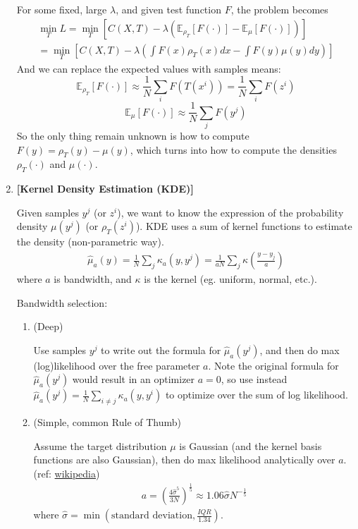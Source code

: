 \documentclass[11pt]{article}
\begin{document}
\begin{enumerate}
    For some fixed, large $\lambda$, and given test function $F$, the problem becomes
    \begin{align}
    \label{eq3}
        \min_T L 
        = \min_T \left[C(X,T) - \lambda (\mathbb{E}_{\rho_{T}} [F(\cdot)] - \mathbb{E}_{\mu} [F(\cdot)]) \right]\\
        = \min_T \left[C(X,T) - \lambda (\int F(x)\rho_T(x) dx - \int F(y)\mu(y) dy) \right]
    \end{align}
    And we can replace the expected values with samples means:
    $$
    \mathbb{E}_{\rho_{T}} [F(\cdot)] \approx \frac{1}{N} \sum_i F(T(x^i))
    = \frac{1}{N} \sum_i F(z^i)
    $$
    $$
    \mathbb{E}_{\mu} [F(\cdot)] \approx \frac{1}{N} \sum_j F(y^j)
    $$
    So the only thing remain unknown is how to compute $F(y) = \rho_T(y) - \mu(y)$, which turns into how to compute the densities $\rho_T(\cdot)$ and $\mu(\cdot)$.
    
    \item {\bf [Kernel Density Estimation (KDE)]}
    
    Given samples $y^j$ (or $z^i$), we want to know the expression of the probability density $\mu(y^j)$ (or $\rho_T(z^i)$). KDE uses a sum of kernel functions to estimate the density (non-parametric way).
    \begin{align*}
        \hat{\mu}_a(y) = \frac{1}{N} \sum_j \kappa_a(y,y^j)
        = \frac{1}{aN} \sum_j \kappa(\frac{y-y_j}{a})
    \end{align*}
    where $a$ is bandwidth, and $\kappa$ is the kernel (eg. uniform, normal, etc.).
    
    Bandwidth selection:
    \begin{enumerate}
        \item (Deep)
        
        Use samples $y^j$ to write out the formula for $\hat{\mu}_a(y^j)$, and then do max (log)likelihood over the free parameter $a$. Note the original formula for $\hat{\mu}_a(y^j)$ would result in an optimizer $a=0$, so use instead $\hat{\mu}_a(y^j) = \frac{1}{N} \sum_{i\ne j} \kappa_a(y,y^i)$ to optimize over the sum of log likelihood.
        
        \item (Simple, common Rule of Thumb)
        
        Assume the target distribution $\mu$ is Gaussian (and the kernel basis functions are also Gaussian), then do max likelihood analytically over $a$. (ref: \href{https://en.wikipedia.org/wiki/Kernel_density_estimation}{wikipedia})
        \begin{align*}
            a = (\frac{4\hat{\sigma}^5}{3N})^{\frac{1}{5}} \approx
            1.06 \hat{\sigma} N^{-\frac{1}{5}}
        \end{align*}
        where $\hat{\sigma} = \min (\text{standard deviation}, \frac{IQR}{1.34})$.
        

\end{enumerate}
\end{enumerate}
\end{document}

